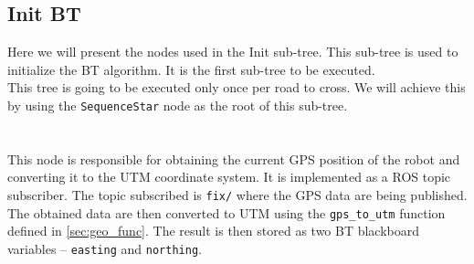 \subsection{Init BT}
        Here we will present the nodes used in the Init sub-tree. This sub-tree is used to initialize the BT algorithm. It is the first sub-tree to be executed.\\
        This tree is going to be executed only once per road to cross. We will achieve this by using the \texttt{SequenceStar} node as the root of this sub-tree.\\\\
        \\
            This node is responsible for obtaining the current GPS position of the robot and converting it to the UTM coordinate system. It is implemented as a ROS topic subscriber. The topic subscribed is \texttt{fix/} where the GPS data are being published.\\
            The obtained data are then converted to UTM using the \texttt{gps\_to\_utm} function defined in \ref{sec:geo_func}. The result is then stored as two BT blackboard variables -- \texttt{easting} and \texttt{northing}.